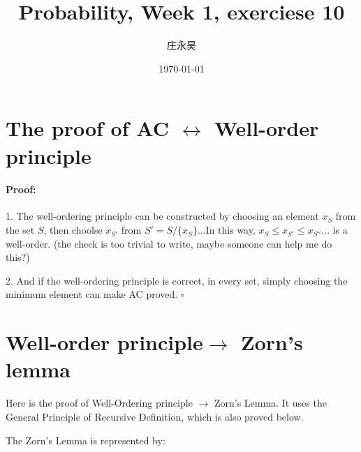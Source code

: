 \documentclass{article}
\title{Probability, Week 1, exerciese 10}
\author{庄永昊}
\date{\today}
\newenvironment{myproof}{\ignorespaces\paragraph{Proof:}}{\hfill $\square$\par\noindent}
\begin{document}
\maketitle

\section{The proof of AC $\leftrightarrow$ Well-order principle} 
\begin{myproof}
1. The well-ordering principle can be constructed by choosing an element $x_S$ from the set $S$, 
then choolse $x_{S'}$ from $S'=S/\{x_S\}$...In this way, $x_S\leq x_{S'}\leq x_{S''}...$ is a well-order.
(the check is too trivial to write, maybe someone can help me do this?) 

2. And if the well-ordering principle is correct, in every set, simply choosing the minimum element can make AC proved. 
\end{myproof}

\section{Well-order principle$\rightarrow$ Zorn's lemma}
Here is the proof of Well-Ordering principle $\rightarrow$ Zorn's Lemma. It uses the General Principle of Recursive Definition, 
which is also proved below. 

The Zorn's Lemma is represented by: 
\end{document}
